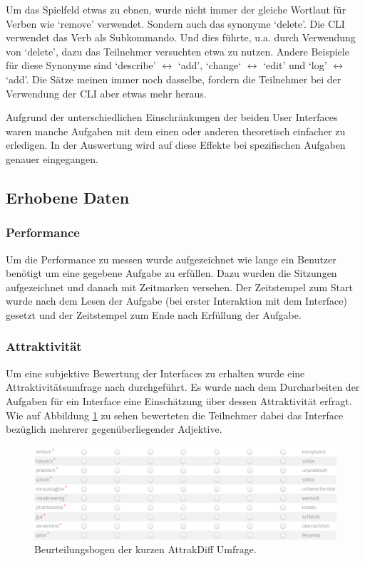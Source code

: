 \documentclass[oneside,bibliography=totocnumbered,BCOR=5mm]{scrbook}
\begin{document}
Um das Spielfeld etwas zu ebnen, wurde nicht immer der gleiche Wortlaut für
Verben wie `remove' verwendet. Sondern auch das synonyme `delete'. Die CLI
verwendet das Verb  als Subkommando. Und dies führte,
u.a. durch Verwendung von `delete', dazu das Teilnehmer versuchten etwa
 zu nutzen. Andere Beispiele für diese Synonyme sind
`describe' $\leftrightarrow$ `add', `change` $\leftrightarrow$ `edit' und `log'
$\leftrightarrow$ `add'. Die Sätze meinen immer noch dasselbe, fordern die
Teilnehmer bei der Verwendung der CLI aber etwas mehr heraus.

Aufgrund der unterschiedlichen Einschränkungen der beiden User Interfaces waren
manche Aufgaben mit dem einen oder anderen theoretisch einfacher zu erledigen.
In der Auswertung wird auf diese Effekte bei spezifischen Aufgaben genauer
eingegangen.

\subsection{Erhobene Daten}

\subsubsection{Performance}

Um die Performance zu messen wurde aufgezeichnet wie lange ein Benutzer benötigt
um eine gegebene Aufgabe zu erfüllen. Dazu wurden die Sitzungen aufgezeichnet
und danach mit Zeitmarken versehen. Der Zeitstempel zum Start wurde nach dem
Lesen der Aufgabe (bei erster Interaktion mit dem Interface) gesetzt und der
Zeitstempel zum Ende nach Erfüllung der Aufgabe.

\subsubsection{Attraktivität}

Um eine subjektive Bewertung der Interfaces zu erhalten wurde eine
Attraktivitätsumfrage nach \textcite{attrakdiff} durchgeführt. Es wurde nach
dem Durcharbeiten der Aufgaben für ein Interface eine Einschätzung über
dessen Attraktivität erfragt. Wie auf Abbildung \ref{fig:survey-values}
zu sehen bewerteten die Teilnehmer dabei das Interface bezüglich mehrerer
gegenüberliegender Adjektive.

\begin{figure}[H]
  \centering
  \includegraphics[scale=0.42]{survey-values.png}
  \caption{Beurteilungsbogen der kurzen AttrakDiff Umfrage.}
  \label{fig:survey-values}
\end{figure}
\end{document}
